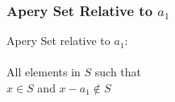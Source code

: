 \documentclass{beamer}
\begin{document}
\begin{frame}
\begin{center}
\frametitle{Apery Set Relative to $a_1$}

Apery Set relative to $a_1$:\\

~\\

All elements in $S$ such that\\

$x \in S$ and $x - a_1 \notin S$\\

~\\


\end{center}
\end{frame}

\end{document}
